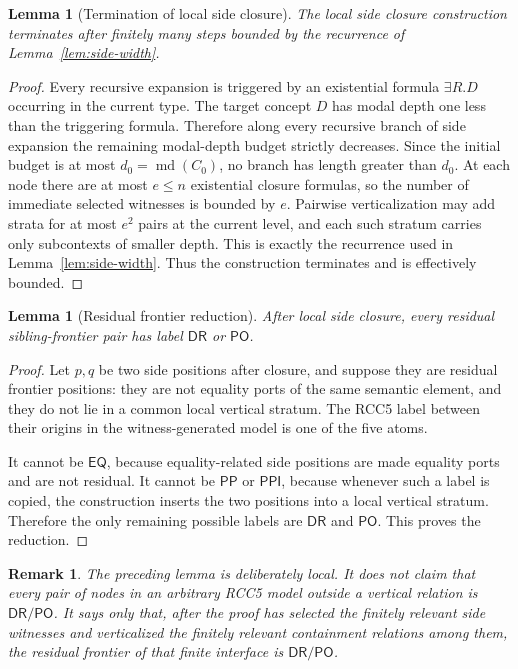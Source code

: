 \documentclass[11pt]{article}
\newtheorem{lemma}[theorem]{Lemma}
\newtheorem{remark}[theorem]{Remark}
\newcommand{\EQ}{\mathsf{EQ}}
\newcommand{\DR}{\mathsf{DR}}
\newcommand{\PO}{\mathsf{PO}}
\newcommand{\PP}{\mathsf{PP}}
\newcommand{\PPI}{\mathsf{PPI}}
\newcommand{\md}{\operatorname{md}}
\begin{document}
\begin{lemma}[Termination of local side closure]
The local side closure construction terminates after finitely many steps bounded by the recurrence of Lemma~\ref{lem:side-width}.
\end{lemma}

\begin{proof}
Every recursive expansion is triggered by an existential formula $\exists R.D$ occurring in the current type.  The target concept $D$ has modal depth one less than the triggering formula.  Therefore along every recursive branch of side expansion the remaining modal-depth budget strictly decreases.  Since the initial budget is at most $d_0=\md(C_0)$, no branch has length greater than $d_0$.  At each node there are at most $e\le n$ existential closure formulas, so the number of immediate selected witnesses is bounded by $e$.  Pairwise verticalization may add strata for at most $e^2$ pairs at the current level, and each such stratum carries only subcontexts of smaller depth.  This is exactly the recurrence used in Lemma~\ref{lem:side-width}.  Thus the construction terminates and is effectively bounded.
\end{proof}

\begin{lemma}[Residual frontier reduction]
After local side closure, every residual sibling-frontier pair has label $\DR$ or $\PO$.
\end{lemma}

\begin{proof}
Let $p,q$ be two side positions after closure, and suppose they are residual frontier positions: they are not equality ports of the same semantic element, and they do not lie in a common local vertical stratum.  The RCC5 label between their origins in the witness-generated model is one of the five atoms.

It cannot be $\EQ$, because equality-related side positions are made equality ports and are not residual.  It cannot be $\PP$ or $\PPI$, because whenever such a label is copied, the construction inserts the two positions into a local vertical stratum.  Therefore the only remaining possible labels are $\DR$ and $\PO$.  This proves the reduction.
\end{proof}

\begin{remark}
The preceding lemma is deliberately local.  It does not claim that every pair of nodes in an arbitrary RCC5 model outside a vertical relation is $\DR/\PO$.  It says only that, after the proof has selected the finitely relevant side witnesses and verticalized the finitely relevant containment relations among them, the residual frontier of that finite interface is $\DR/\PO$.
\end{remark}
\end{document}
